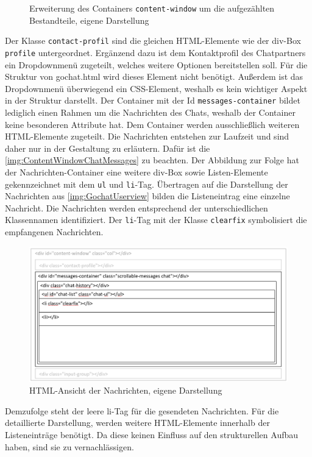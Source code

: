 \documentclass[a4paper,titlepage,halfparskip,12pt]{scrreprt}
\begin{document}
\begin{onehalfspacing}
\begin{figure}[h]
	\caption{Erweiterung des Containers \texttt{content-window} um die aufgezählten Bestandteile, eigene Darstellung}
	\label{img:Content-window}
\end{figure}
Der Klasse \texttt{contact-profil} sind die gleichen HTML-Elemente wie der div-Box \texttt{profile} untergeordnet. Ergänzend dazu ist dem Kontaktprofil des Chatpartners ein Dropdownmenü zugeteilt, welches weitere Optionen bereitstellen soll. Für die Struktur von gochat.html wird dieses Element nicht benötigt. Außerdem ist das Dropdownmenü überwiegend ein CSS-Element, weshalb es kein wichtiger Aspekt in der Struktur darstellt. Der Container mit der Id \texttt{messages-container} bildet lediglich einen Rahmen um die Nachrichten des Chats, weshalb der Container keine besonderen Attribute hat. Dem Container werden ausschließlich weiteren HTML-Elemente zugeteilt. Die Nachrichten entstehen zur Laufzeit und sind daher nur in der Gestaltung zu erläutern. Dafür ist die \autoref{img:ContentWindowChatMessages} zu beachten. Der Abbildung zur Folge hat der Nachrichten-Container eine weitere div-Box sowie Listen-Elemente gekennzeichnet mit dem \texttt{ul} und \texttt{li}-Tag. Übertragen auf die Darstellung der Nachrichten aus \autoref{img:GochatUserview} bilden die Listeneintrag eine einzelne Nachricht. Die Nachrichten werden entsprechend der unterschiedlichen Klassennamen identifiziert. Der \texttt{li}-Tag mit der Klasse \texttt{clearfix} symbolisiert die empfangenen Nachrichten.
\begin{figure}[h]
	\centering
	\includegraphics[scale=0.45]{images/ContentWindowChatMessages}
	\caption{HTML-Ansicht der Nachrichten, eigene Darstellung}
	\label{img:ContentWindowChatMessages}
\end{figure}
Demzufolge steht der leere li-Tag für die gesendeten Nachrichten. Für die detaillierte Darstellung, werden weitere HTML-Elemente innerhalb der Listeneinträge benötigt. Da diese keinen Einfluss auf den strukturellen Aufbau haben, sind sie zu vernachlässigen.\\

\end{onehalfspacing}
\end{document}
